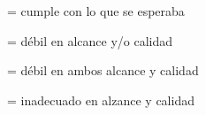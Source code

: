 \begin{description}[itemsep=0em]
\item[3]{= cumple con lo que se esperaba}
\item[2]{= d\'{e}bil en alcance y/o calidad}
\item[1]{= d\'{e}bil en ambos alcance y calidad}
\item[0]{= inadecuado en alzance y calidad}
\end{description}
